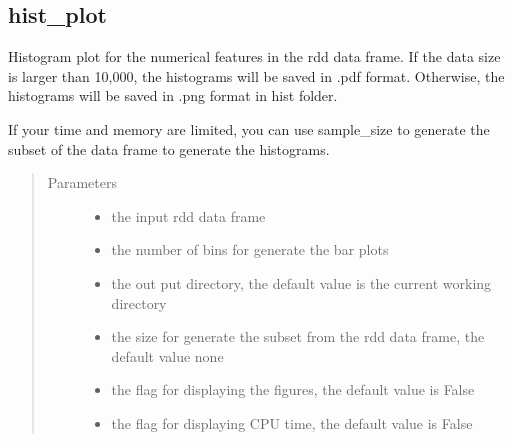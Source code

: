 \documentclass[letterpaper,12pt,english]{sphinxmanual}
\begin{document}
\subsection{hist\_plot}
\label{\detokenize{basics:hist-plot}}

\begin{fulllineitems}
Histogram plot for the numerical features in the rdd data frame.  If the data size is larger than 10,000, the histograms will be saved in .pdf
format. Otherwise, the histograms will be saved in .png format in hist folder.

If your time and memory are limited, you can use sample\_size to generate the subset of the data
frame to generate the histograms.
\begin{quote}\begin{description}
\item[{Parameters}] \leavevmode\begin{itemize}
\item {} 
 \textendash{} the input rdd data frame

\item {} 
 \textendash{} the number of bins for generate the bar plots

\item {} 
 \textendash{} the out put directory, the default value is the current working directory

\item {} 
 \textendash{} the size for generate the subset from the rdd data frame, the
default value none

\item {} 
 \textendash{} the flag for displaying the figures, the default value is False

\item {} 
 \textendash{} the flag for displaying CPU time, the default value is False

\end{itemize}

\end{description}\end{quote}

\end{fulllineitems}
\end{document}
